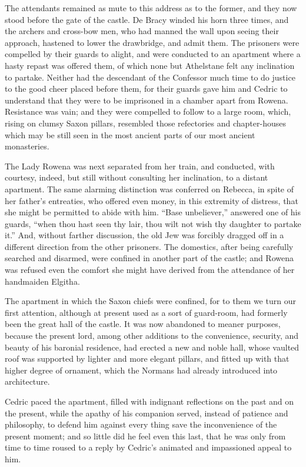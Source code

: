The attendants remained as mute to this address as to the former, and
they now stood before the gate of the castle. De Bracy winded his horn
three times, and the archers and cross-bow men, who had manned the wall
upon seeing their approach, hastened to lower the drawbridge, and admit
them. The prisoners were compelled by their guards to alight, and were
conducted to an apartment where a hasty repast was offered them, of
which none but Athelstane felt any inclination to partake. Neither had
the descendant of the Confessor much time to do justice to the good
cheer placed before them, for their guards gave him and Cedric to
understand that they were to be imprisoned in a chamber apart from
Rowena. Resistance was vain; and they were compelled to follow to a
large room, which, rising on clumsy Saxon pillars, resembled those
refectories and chapter-houses which may be still seen in the most
ancient parts of our most ancient monasteries.

The Lady Rowena was next separated from her train, and conducted, with
courtesy, indeed, but still without consulting her inclination, to a
distant apartment. The same alarming distinction was conferred on
Rebecca, in spite of her father's entreaties, who offered even money, in
this extremity of distress, that she might be permitted to abide with
him. ``Base unbeliever,'' answered one of his guards, ``when thou hast
seen thy lair, thou wilt not wish thy daughter to partake it.'' And,
without farther discussion, the old Jew was forcibly dragged off in a
different direction from the other prisoners. The domestics, after being
carefully searched and disarmed, were confined in another part of the
castle; and Rowena was refused even the comfort she might have derived
from the attendance of her handmaiden Elgitha.

The apartment in which the Saxon chiefs were confined, for to them we
turn our first attention, although at present used as a sort of
guard-room, had formerly been the great hall of the castle. It was now
abandoned to meaner purposes, because the present lord, among other
additions to the convenience, security, and beauty of his baronial
residence, had erected a new and noble hall, whose vaulted roof was
supported by lighter and more elegant pillars, and fitted up with that
higher degree of ornament, which the Normans had already introduced into
architecture.

Cedric paced the apartment, filled with indignant reflections on the
past and on the present, while the apathy of his companion served,
instead of patience and philosophy, to defend him against every thing
save the inconvenience of the present moment; and so little did he feel
even this last, that he was only from time to time roused to a reply by
Cedric's animated and impassioned appeal to him.

